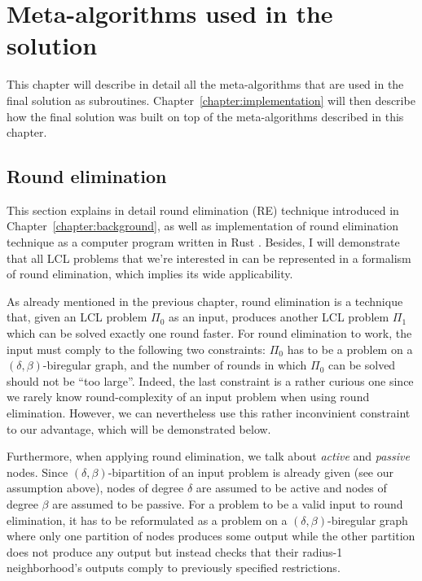 \chapter{Meta-algorithms used in the solution}
\label{chapter:environment}

This chapter will describe in detail all the meta-algorithms that are
used in the final solution as subroutines.
Chapter~\ref{chapter:implementation} will then
describe how the final solution was built on top of the meta-algorithms
described in this chapter.

\section{Round elimination}

This section explains in detail round elimination (RE)
technique introduced in Chapter~\ref{chapter:background}, as well as
implementation of round elimination technique as a computer
program written in Rust \cite{Brandt2019, Olivetti2020}.
Besides, I will demonstrate that all LCL problems that
we're interested in can be represented in a formalism
of round elimination, which implies
its wide applicability.

As already mentioned in the previous chapter, round elimination
is a technique that, given an LCL problem $\Pi_0$ as an input, produces
another LCL problem $\Pi_1$ which can be solved exactly one round
faster. For round elimination to work, the input must comply
to the following two constraints: $\Pi_0$ has to be a problem on a $(\delta, \beta)$-biregular
graph, and the number of rounds in which $\Pi_0$ can be solved
should not be ``too large''. Indeed, the last constraint is a rather curious one
since we rarely know round-complexity of an input problem when using
round elimination. However, we can nevertheless use this rather inconvinient constraint
to our advantage, which will be demonstrated below.

Furthermore, when applying round elimination, we talk about \emph{active} and
\emph{passive} nodes. Since $(\delta, \beta)$-bipartition of an input problem is
already given (see our assumption above), nodes of degree $\delta$ are assumed
to be active and nodes of degree $\beta$ are assumed to be passive. For a problem
to be a valid input to round elimination, it has to be reformulated as a problem on
a $(\delta, \beta)$-biregular graph where only one partition of nodes produces
some output while the other partition does not produce any output but instead
checks that their radius-1 neighborhood's outputs comply to previously
specified restrictions.

